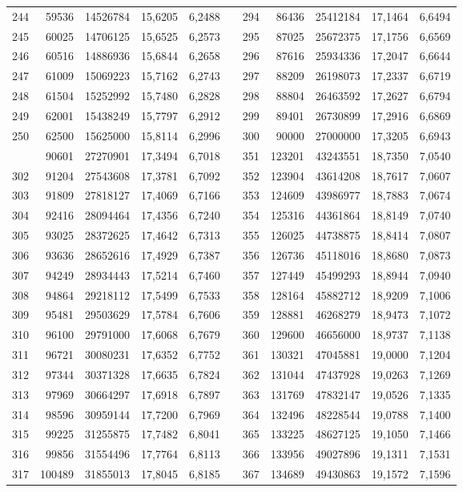 \begin{longtable}{rrrrrrrrrrr}
244&59536&14526784&15,6205&6,2488&&294&86436&25412184&17,1464&6,6494\\
245&60025&14706125&15,6525&6,2573&&295&87025&25672375&17,1756&6,6569\\
246&60516&14886936&15,6844&6,2658&&296&87616&25934336&17,2047&6,6644\\
247&61009&15069223&15,7162&6,2743&&297&88209&26198073&17,2337&6,6719\\
248&61504&15252992&15,7480&6,2828&&298&88804&26463592&17,2627&6,6794\\
249&62001&15438249&15,7797&6,2912&&299&89401&26730899&17,2916&6,6869\\
250&62500&15625000&15,8114&6,2996&&300&90000&27000000&17,3205&6,6943\\
\newpage
301&90601&27270901&17,3494&6,7018&&351&123201&43243551&18,7350&7,0540\\
302&91204&27543608&17,3781&6,7092&&352&123904&43614208&18,7617&7,0607\\
303&91809&27818127&17,4069&6,7166&&353&124609&43986977&18,7883&7,0674\\
304&92416&28094464&17,4356&6,7240&&354&125316&44361864&18,8149&7,0740\\
305&93025&28372625&17,4642&6,7313&&355&126025&44738875&18,8414&7,0807\\
306&93636&28652616&17,4929&6,7387&&356&126736&45118016&18,8680&7,0873\\
307&94249&28934443&17,5214&6,7460&&357&127449&45499293&18,8944&7,0940\\
308&94864&29218112&17,5499&6,7533&&358&128164&45882712&18,9209&7,1006\\
309&95481&29503629&17,5784&6,7606&&359&128881&46268279&18,9473&7,1072\\
310&96100&29791000&17,6068&6,7679&&360&129600&46656000&18,9737&7,1138\\
311&96721&30080231&17,6352&6,7752&&361&130321&47045881&19,0000&7,1204\\
312&97344&30371328&17,6635&6,7824&&362&131044&47437928&19,0263&7,1269\\
313&97969&30664297&17,6918&6,7897&&363&131769&47832147&19,0526&7,1335\\
314&98596&30959144&17,7200&6,7969&&364&132496&48228544&19,0788&7,1400\\
315&99225&31255875&17,7482&6,8041&&365&133225&48627125&19,1050&7,1466\\
316&99856&31554496&17,7764&6,8113&&366&133956&49027896&19,1311&7,1531\\
317&100489&31855013&17,8045&6,8185&&367&134689&49430863&19,1572&7,1596\\

\end{longtable}
